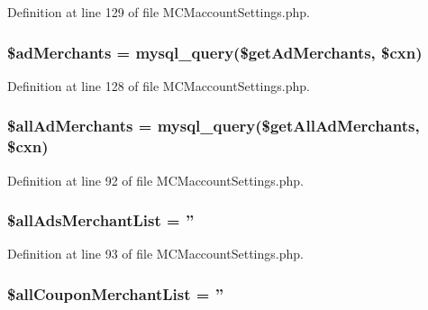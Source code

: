 Definition at line 129 of file M\-C\-Maccount\-Settings.\-php.

\hypertarget{_m_c_maccount_settings_8php_a606d9139cc8585dd4ad8bf2f3897dcab}{
\subsubsection[{\$ad\-Merchants}]{\setlength{\rightskip}{0pt plus 5cm}\$ad\-Merchants = mysql\-\_\-query(\$get\-Ad\-Merchants, \$cxn)}}\label{_m_c_maccount_settings_8php_a606d9139cc8585dd4ad8bf2f3897dcab}


Definition at line 128 of file M\-C\-Maccount\-Settings.\-php.

\hypertarget{_m_c_maccount_settings_8php_a8a13c248d6e767ec3a93debb562f3a3f}{
\subsubsection[{\$all\-Ad\-Merchants}]{\setlength{\rightskip}{0pt plus 5cm}\$all\-Ad\-Merchants = mysql\-\_\-query(\$get\-All\-Ad\-Merchants, \$cxn)}}\label{_m_c_maccount_settings_8php_a8a13c248d6e767ec3a93debb562f3a3f}


Definition at line 92 of file M\-C\-Maccount\-Settings.\-php.

\hypertarget{_m_c_maccount_settings_8php_a17349accdafb921446876ffa9476c666}{
\subsubsection[{\$all\-Ads\-Merchant\-List}]{\setlength{\rightskip}{0pt plus 5cm}\$all\-Ads\-Merchant\-List = ''}}\label{_m_c_maccount_settings_8php_a17349accdafb921446876ffa9476c666}


Definition at line 93 of file M\-C\-Maccount\-Settings.\-php.

\hypertarget{_m_c_maccount_settings_8php_aaa22e8608f806a04f7f5bd340ca807d6}{
\subsubsection[{\$all\-Coupon\-Merchant\-List}]{\setlength{\rightskip}{0pt plus 5cm}\$all\-Coupon\-Merchant\-List = ''}}\label{_m_c_maccount_settings_8php_aaa22e8608f806a04f7f5bd340ca807d6}


